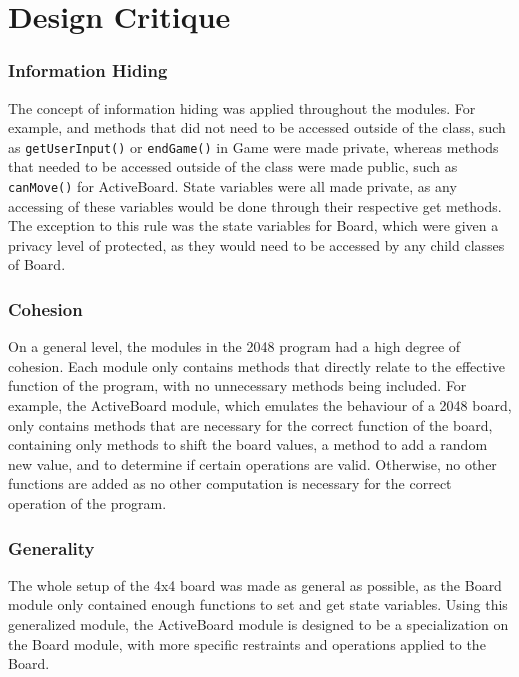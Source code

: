 \documentclass[12pt]{article}
\begin{document}
\newpage

\section*{Design Critique}

\subsubsection*{Information Hiding}
The concept of information hiding was applied throughout the modules. For example, and methods that did not need to be accessed outside of the class, such as \texttt{getUserInput()} or \texttt{endGame()} in Game were made private, whereas methods that needed to be accessed outside of the class were made public, such as \texttt{canMove()} for ActiveBoard. State variables were all made private, as any accessing of these variables would be done through their respective get methods. The exception to this rule was the state variables for Board, which were given a privacy level of protected, as they would need to be accessed by any child classes of Board. 

\subsubsection*{Cohesion}
On a general level, the modules in the 2048 program had a high degree of cohesion. Each module only contains methods that directly relate to the effective function of the program, with no unnecessary methods being included. For example, the ActiveBoard module, which emulates the behaviour of a 2048 board, only contains methods that are necessary for the correct function of the board, containing only methods to shift the board values, a method to add a random new value, and to determine if certain operations are valid. Otherwise, no other functions are added as no other computation is necessary for the correct operation of the program.

\subsubsection*{Generality}
The whole setup of the 4x4 board was made as general as possible, as the Board module only contained enough functions to set and get state variables. Using this generalized module, the ActiveBoard module is designed to be a specialization on the Board module, with more specific restraints and operations applied to the Board.
\end{document}
